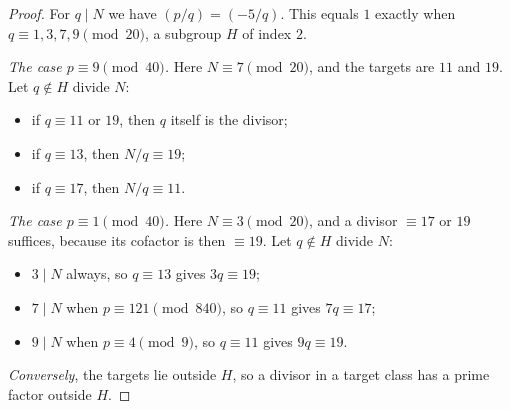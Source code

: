 \begin{proof}
For $q\mid N$ we have $(p/q)=(-5/q)$. This equals $1$ exactly when $q\equiv1,3,7,9\pmod{20}$, a subgroup $H$ of index $2$.

\emph{The case $p\equiv9\pmod{40}$.} Here $N\equiv7\pmod{20}$, and the targets are $11$ and $19$. Let $q\notin H$ divide $N$:
\begin{itemize}
\item if $q\equiv11$ or $19$, then $q$ itself is the divisor;
\item if $q\equiv13$, then $N/q\equiv19$;
\item if $q\equiv17$, then $N/q\equiv11$.
\end{itemize}

\emph{The case $p\equiv1\pmod{40}$.} Here $N\equiv3\pmod{20}$, and a divisor $\equiv17$ or $19$ suffices, because its cofactor is then $\equiv19$. Let $q\notin H$ divide $N$:
\begin{itemize}
\item $3\mid N$ always, so $q\equiv13$ gives $3q\equiv19$;
\item $7\mid N$ when $p\equiv121\pmod{840}$, so $q\equiv11$ gives $7q\equiv17$;
\item $9\mid N$ when $p\equiv4\pmod9$, so $q\equiv11$ gives $9q\equiv19$.
\end{itemize}

\emph{Conversely}, the targets lie outside $H$, so a divisor in a target class has a prime factor outside $H$.
\end{proof}

